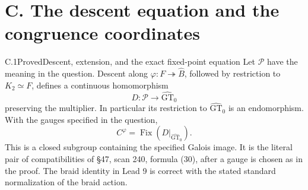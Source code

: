 \section{C. The descent equation and the congruence coordinates}

\begin{statement}{C.1}{Proved}{Descent, extension, and the exact fixed-point equation}
Let $\mathcal P$ have the meaning in the question. Descent along
$\varphi:F\twoheadrightarrow\widehat B$, followed by restriction to
$K_2\simeq F$, defines a continuous homomorphism
\[
 D:\mathcal P\longrightarrow\widehat{\mathrm{GT}}_0
\]
preserving the multiplier. In particular its restriction to
$\widehat{\mathrm{GT}}_0$ is an endomorphism. With the gauges specified
in the question,
\[
 C^\varphi=\operatorname{Fix}(D|_{\widehat{\mathrm{GT}}_0}).
\]
This is a closed subgroup containing the specified Galois image.
It is the literal pair of compatibilities of \S47, scan 240,
formula (30), after a gauge is chosen as in the proof.
The braid identity in Lead 9 is correct with the stated standard
normalization of the braid action.
\end{statement}

